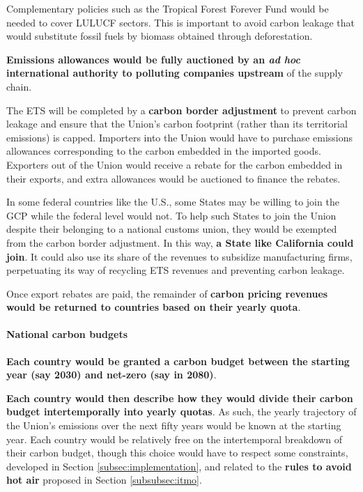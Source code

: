 \documentclass[12pt,english]{article}
\begin{document}
Complementary policies such as the Tropical Forest Forever Fund would be needed to cover LULUCF sectors. This is important to avoid carbon leakage that would substitute fossil fuels by biomass obtained through deforestation.

\textbf{Emissions allowances would be fully auctioned by an \textit{ad hoc} international authority to polluting companies upstream} of the supply chain. 

The ETS will be completed by a \textbf{carbon border adjustment} to prevent carbon leakage and ensure that the Union's carbon footprint (rather than its territorial emissions) is capped. Importers into the Union would have to purchase emissions allowances corresponding to the carbon embedded in the imported goods. Exporters out of the Union would receive a rebate for the carbon embedded in their exports, and extra allowances would be auctioned to finance the rebates. 

In some federal countries like the U.S., some States may be willing to join the GCP while the federal level would not. To help such States to join the Union despite their belonging to a national customs union, they would be exempted from the carbon border adjustment. In this way, \textbf{a State like California could join}. It could also use its share of the revenues to subsidize manufacturing firms, perpetuating its way of recycling ETS revenues and preventing carbon leakage.

Once export rebates are paid, the remainder of \textbf{carbon pricing revenues would be returned to countries based on their yearly quota}.

\paragraph{National carbon budgets}
\textbf{Each country would be granted a carbon budget between the starting year (say 2030) and net-zero (say in 2080)}. 

\textbf{Each country would then describe how they would divide their carbon budget intertemporally into yearly quotas}. As such, the yearly trajectory of the Union's emissions over the next fifty years would be known at the starting year. Each country would be relatively free on the intertemporal breakdown of their carbon budget, though this choice would have to respect some constraints, developed in Section \ref{subsec:implementation}, and related to the \textbf{rules to avoid hot air} proposed in Section \ref{subsubsec:itmo}.
\end{document}
